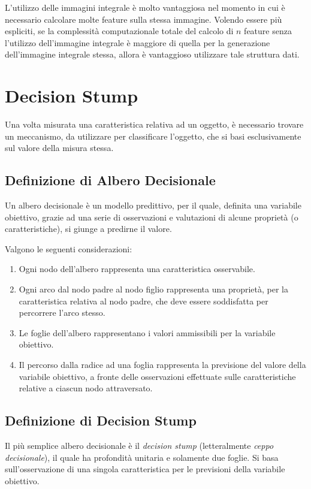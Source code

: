         L'utilizzo delle immagini integrale è molto vantaggiosa nel momento in cui è necessario calcolare molte feature sulla stessa immagine.
        Volendo essere più espliciti, se la complessità computazionale totale del calcolo di $n$ feature senza l'utilizzo dell'immagine integrale è maggiore di quella per la generazione dell'immagine integrale stessa, allora è vantaggioso utilizzare tale struttura dati.

    \section{Decision Stump}
    \label{sec:decision_stump}
        Una volta misurata una caratteristica relativa ad un oggetto, è necessario trovare un meccanismo, da utilizzare per classificare l'oggetto, che si basi esclusivamente sul valore della misura stessa.        

        \subsection{Definizione di Albero Decisionale}
        Un albero decisionale è un modello predittivo, per il quale, definita una variabile obiettivo, grazie ad una serie di osservazioni e valutazioni di alcune proprietà (o caratteristiche), si giunge a predirne il valore.

        Valgono le seguenti considerazioni:
        \begin{enumerate}
            \item Ogni nodo dell'albero rappresenta una caratteristica osservabile.
            \item Ogni arco dal nodo padre al nodo figlio rappresenta una proprietà, per la caratteristica relativa al nodo padre, che deve essere soddisfatta per percorrere l'arco stesso.
            \item Le foglie dell'albero rappresentano i valori ammissibili per la variabile obiettivo.
            \item Il percorso dalla radice ad una foglia rappresenta la previsione del valore della variabile obiettivo, a fronte delle osservazioni effettuate sulle caratteristiche relative a ciascun nodo attraversato.
        \end{enumerate}

        \subsection{Definizione di Decision Stump}
            Il più semplice albero decisionale è il \emph{decision stump} (letteralmente \emph{ceppo decisionale}), il quale ha profondità unitaria e solamente due foglie.
            Si basa sull'osservazione di una singola caratteristica per le previsioni della variabile obiettivo.

